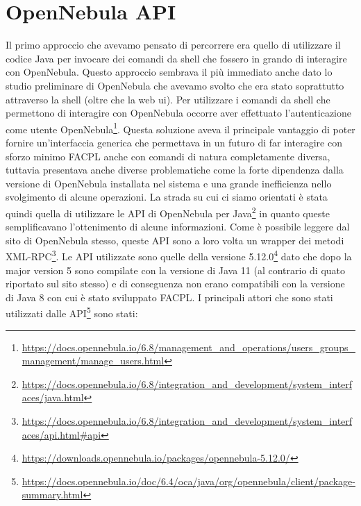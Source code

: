 \section{OpenNebula API}
Il primo approccio che avevamo pensato di percorrere era quello di utilizzare il codice Java per invocare dei comandi da shell che fossero in grando di interagire con OpenNebula. Questo approccio sembrava il più immediato anche dato lo studio preliminare di OpenNebula che avevamo svolto che era stato soprattutto attraverso la shell (oltre che la web ui).\medbreak
Per utilizzare i comandi da shell che permettono di interagire con OpenNebula occorre aver effettuato l'autenticazione come utente OpenNebula\footnote{\url{https://docs.opennebula.io/6.8/management_and_operations/users_groups_management/manage_users.html}}.
Questa soluzione aveva il principale vantaggio di poter fornire un'interfaccia generica che permettava in un futuro di far interagire con sforzo minimo FACPL anche con comandi di natura completamente diversa, tuttavia presentava anche diverse problematiche come la forte dipendenza dalla versione di OpenNebula installata nel sistema e una grande inefficienza nello svolgimento di alcune operazioni.\medbreak
La strada su cui ci siamo orientati è stata quindi quella di utilizzare le API di OpenNebula per Java\footnote{\url{https://docs.opennebula.io/6.8/integration_and_development/system_interfaces/java.html}} in quanto queste semplificavano l'ottenimento di alcune informazioni. Come è possibile leggere dal sito di OpenNebula stesso, queste API sono a loro volta un wrapper dei metodi XML-RPC\footnote{\url{https://docs.opennebula.io/6.8/integration_and_development/system_interfaces/api.html\#api}}.
Le API utilizzate sono quelle della versione 5.12.0\footnote{\url{https://downloads.opennebula.io/packages/opennebula-5.12.0/}} dato che dopo la major version 5 sono compilate con la versione di Java 11 (al contrario di quato riportato sul sito stesso) e di conseguenza non erano compatibili con la versione di Java 8 con cui è stato sviluppato FACPL.
I principali attori che sono stati utilizzati dalle API\footnote{\url{https://docs.opennebula.io/doc/6.4/oca/java/org/opennebula/client/package-summary.html}} sono stati:
